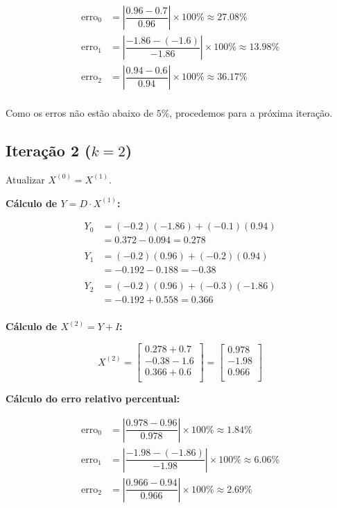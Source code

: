 \documentclass{article}
\begin{document}
\begin{align*}
\text{erro}_0 &= \left| \dfrac{0.96 - 0.7}{0.96} \right| \times 100\% \approx 27.08\% \\
\text{erro}_1 &= \left| \dfrac{-1.86 - (-1.6)}{-1.86} \right| \times 100\% \approx 13.98\% \\
\text{erro}_2 &= \left| \dfrac{0.94 - 0.6}{0.94} \right| \times 100\% \approx 36.17\% \\
\end{align*}

Como os erros não estão abaixo de $5\%$, procedemos para a próxima iteração.

\subsection*{Iteração 2 ($k = 2$)}

Atualizar $X^{(0)} = X^{(1)}$.

\textbf{Cálculo de $Y = D \cdot X^{(1)}$:}

\begin{align*}
Y_0 &= (-0.2)(-1.86) + (-0.1)(0.94) \\
&= 0.372 - 0.094 = 0.278 \\
\\
Y_1 &= (-0.2)(0.96) + (-0.2)(0.94) \\
&= -0.192 - 0.188 = -0.38 \\
\\
Y_2 &= (-0.2)(0.96) + (-0.3)(-1.86) \\
&= -0.192 + 0.558 = 0.366 \\
\end{align*}

\textbf{Cálculo de $X^{(2)} = Y + I$:}

\[
X^{(2)} = \begin{bmatrix}
0.278 + 0.7 \\
-0.38 - 1.6 \\
0.366 + 0.6 \\
\end{bmatrix} = \begin{bmatrix}
0.978 \\
-1.98 \\
0.966 \\
\end{bmatrix}
\]

\textbf{Cálculo do erro relativo percentual:}

\begin{align*}
\text{erro}_0 &= \left| \dfrac{0.978 - 0.96}{0.978} \right| \times 100\% \approx 1.84\% \\
\text{erro}_1 &= \left| \dfrac{-1.98 - (-1.86)}{-1.98} \right| \times 100\% \approx 6.06\% \\
\text{erro}_2 &= \left| \dfrac{0.966 - 0.94}{0.966} \right| \times 100\% \approx 2.69\% \\
\end{align*}
\end{document}
